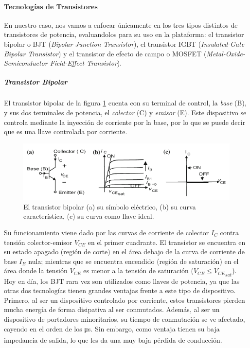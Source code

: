 \paragraph{Tecnologías de Transistores}

En nuestro caso, nos vamos a enfocar únicamente en los tres tipos distintos de transistores de potencia, evaluandolos para su uso en la plataforma: el transistor bipolar o BJT (\textit{Bipolar Junction Transistor}), el transistor IGBT (\textit{Insulated-Gate Bipolar Transistor}) y el transistor de efecto de campo o MOSFET (\textit{Metal-Oxide-Semiconductor Field-Effect Transistor}).\\

\subparagraph{Transistor Bipolar}

El transistor bipolar de la figura \ref{bjt} cuenta con su terminal de control, la \textit{base} (B), y sus dos terminales de potencia, el \textit{colector} (C) y \textit{emisor} (E). Este dispositivo se controla mediante la inyección de corriente por la base, por lo que se puede decir que es una llave controlada por corriente.\\

\begin{figure}[h]
    \centering
    \includegraphics[scale=0.6]{Imagenes/BJT.png}
    \caption{El transistor bipolar (a) su símbolo eléctrico, (b) su curva característica, (c) su curva como llave ideal.}
    \label{bjt}
\end{figure}

Su funcionamiento viene dado por las curvas de corriente de colector $I_C$ contra tensión colector-emisor $V_{CE}$ en el primer cuadrante. El transistor se encuentra en su estado apagado (región de corte) en el área debajo de la curva de corriente de base $I_B$ nula; mientras que se encuentra encendido (región de saturación) en el área donde la tensión $V_{CE}$ es menor a la tensión de saturación ($V_{CE} \leq {V_{CE}}_{sat}$).\\

Hoy en día, los BJT rara vez son utilizados como llaves de potencia, ya que las otras dos tecnologías tienen grandes ventajas frente a este tipo de dispositivo. Primero, al ser un dispositivo controlado por corriente, estos transistores pierden mucha energía de forma disipativa al ser conmutados. Además, al ser un dispositivo de portadores minoritarios, su tiempo de conmutación se ve afectado, cayendo en el orden de los \unit[]{\micro\second}. Sin embargo, como ventaja tienen su baja impedancia de salida, lo que les da una muy baja pérdida de conducción.\textsuperscript{\cite{PotenciaHart}\cite{PowerElecRenewableEnergySystems}}\\

